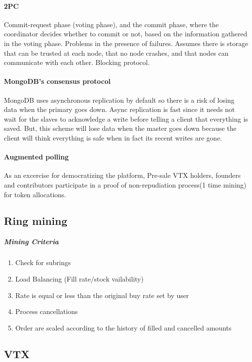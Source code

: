 \documentclass[]{article}
\begin{document}
\paragraph{2PC}
Commit-request phase (voting phase), and the commit phase, where the coordinator decides whether to commit or not, based on the information gathered in the voting phase. Problems in the presence of failures. Assumes there is storage that can be trusted at each node, that no node crashes, and that nodes can communicate with each other. Blocking protocol. 

\paragraph{MongoDB's consensus protocol}
MongoDB uses asynchronous replication by default so there is a risk of losing data when the primary goes down.
Async replication is fast since it needs not wait for the slaves to
acknowledge a write before telling a client that everything is saved.
But, this scheme will lose data when the master goes down because the
client will think everything is safe when in fact its recent writes
are gone. 

\paragraph{Augmented polling}
As an excercise for democratizing the platform,
Pre-sale VTX holders, founders and contributors 
participate in a proof of non-repudiation process(1 time mining) 
for token allocations.


\subsection{Ring mining}
\subparagraph{Mining Criteria}
		\begin{enumerate}
		\item Check for subrings
		\item Load Balancing (Fill rate/stock vailability)
		\item Rate is equal or less than the original buy rate set by user
		\item Process cancellations
		\item Order are scaled according to the history of filled and cancelled amounts 
		\end{enumerate}		

\subsection{VTX}
\end{document}
